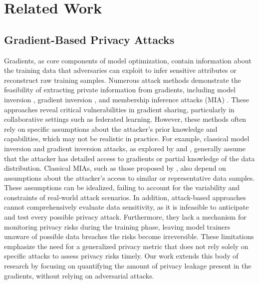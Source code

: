 \section{Related Work}

\subsection{Gradient-Based Privacy Attacks}

Gradients, as core components of model optimization, contain information about the training data that adversaries can exploit to infer sensitive attributes or reconstruct raw training samples. Numerous attack methods demonstrate the feasibility of extracting private information from gradients, including model inversion \cite{fredrikson2015model} \cite{zhang2020secret} \cite{wang2021variational}, gradient inversion \cite{zhu2019deep} \cite{zhao2021exploiting} \cite{liang2023egia} \cite{ye2024gradient} \cite{fang2023gifd}, and membership inference attacks (MIA) \cite{shokri2017membership} \cite{truex2019demystifying} \cite{choquette2021label} \cite{hu2022membership}. These approaches reveal critical vulnerabilities in gradient sharing, particularly in collaborative settings such as federated learning. However, these methods often rely on specific assumptions about the attacker's prior knowledge and capabilities, which may not be realistic in practice. For example, classical model inversion and gradient inversion attacks, as explored by \cite{fredrikson2015model} and \cite{zhu2019deep}, generally assume that the attacker has detailed access to gradients or partial knowledge of the data distribution. Classical MIAs, such as those proposed by \cite{shokri2017membership}, also depend on assumptions about the attacker's access to similar or representative data samples. These assumptions can be idealized, failing to account for the variability and constraints of real-world attack scenarios. In addition, attack-based approaches cannot comprehensively evaluate data sensitivity, as it is infeasible to anticipate and test every possible privacy attack. Furthermore, they lack a mechanism for monitoring privacy risks during the training phase, leaving model trainers unaware of possible data breaches the risks become irreversible. These limitations emphasize the need for a generalized privacy metric that does not rely solely on specific attacks to assess privacy risks timely. Our work extends this body of research by focusing on quantifying the amount of privacy leakage present in the gradients, without relying on adversarial attacks.


